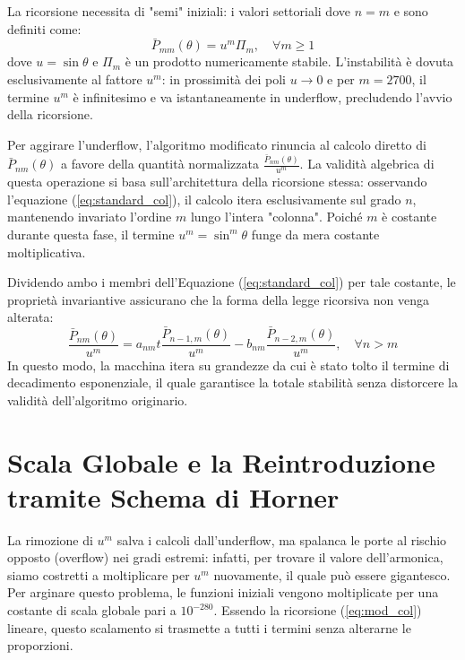 La ricorsione necessita di "semi" iniziali: i valori settoriali dove $n=m$ e sono definiti come:
\begin{equation}
\bar{P}_{mm}(\theta) = u^m \Pi_m, \quad \forall m \ge 1
\end{equation}
dove $u = \sin \theta$ e $\Pi_m$ è un prodotto numericamente stabile. L'instabilità è dovuta esclusivamente al fattore $u^m$: in prossimità dei poli $u \rightarrow 0$ e per $m=2700$, il termine $u^m$ è infinitesimo e va istantaneamente in underflow, precludendo l'avvio della ricorsione.

Per aggirare l'underflow, l'algoritmo modificato rinuncia al calcolo diretto di $\bar{P}_{nm}(\theta)$ a favore della quantità normalizzata $\frac{\bar{P}_{nm}(\theta)}{u^m}$.
La validità algebrica di questa operazione si basa sull'architettura della ricorsione stessa: osservando l'equazione (\ref{eq:standard_col}), il calcolo itera esclusivamente sul grado $n$, mantenendo invariato l'ordine $m$ lungo l'intera "colonna". Poiché $m$ è costante durante questa fase, il termine $u^m = \sin^m \theta$ funge da mera costante moltiplicativa. 

Dividendo ambo i membri dell'Equazione (\ref{eq:standard_col}) per tale costante, le proprietà invariantive assicurano che la forma della legge ricorsiva non venga alterata:
\begin{equation}
\frac{\bar{P}_{nm}(\theta)}{u^m} = a_{nm} t \frac{\bar{P}_{n-1,m}(\theta)}{u^m} - b_{nm} \frac{\bar{P}_{n-2,m}(\theta)}{u^m}, \quad \forall n > m \label{eq:mod_col}
\end{equation}
In questo modo, la macchina itera su grandezze da cui è stato tolto il termine di decadimento esponenziale, il quale garantisce la totale stabilità senza distorcere la validità dell'algoritmo originario. 

\section{Scala Globale e la Reintroduzione tramite Schema di Horner}

La rimozione di $u^m$ salva i calcoli dall'underflow, ma spalanca le porte al rischio opposto (overflow) nei gradi estremi: infatti, per trovare il valore dell'armonica, siamo costretti a moltiplicare per $u^m$ nuovamente, il quale può essere gigantesco. Per arginare questo problema, le funzioni iniziali vengono moltiplicate per una costante di scala globale pari a $10^{-280}$. Essendo la ricorsione (\ref{eq:mod_col}) lineare, questo scalamento si trasmette a tutti i termini senza alterarne le proporzioni.

